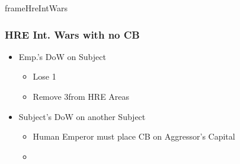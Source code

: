 \documentclass[10pt]{article}
\newlength{\fhHreIntWars} \setlength\fhHreIntWars{4\baselineskip}
\begin{document}
\begin{dynamiccontents*}{frameHreIntWars}\begin{eubox}{\fhHreIntWars}
	\begin{multicols}{2}
		\subsubsection*{HRE Int. Wars with no CB }
		\begin{itemize}
			\item Emp.'s DoW on Subject
			\begin{itemize}
				\item Lose 1\authority
				\item Remove 3\influence from HRE Areas
			\end{itemize}
			\item Subject's DoW on another Subject
			\begin{itemize}
				\item Human Emperor must place CB on Aggressor's Capital
				\item {}
			\end{itemize}
		\end{itemize}
	\end{multicols}
\end{eubox}\end{dynamiccontents*}
\end{document}
